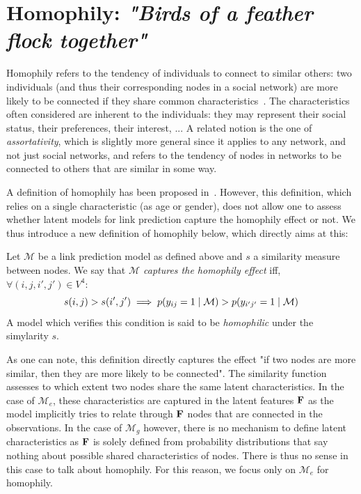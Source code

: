 \section{Homophily: \emph{"Birds of a feather flock together"}}
\label{sec:homophily}

Homophily refers to the tendency of individuals to connect to similar others: two individuals (and thus their corresponding nodes in a social network) are more likely to be connected if they share common characteristics~\cite{mcpherson2001birds,lazarsfeld1954friendship}. The characteristics often considered are inherent to the individuals: they may represent their social status, their preferences, their interest, ... A related notion is the one of {\it assortativity}, which is slightly more general since it applies to any network, and not just social networks, and refers to the tendency of nodes in networks to be connected to others that are similar in some way.

A definition of homophily has been proposed in~\cite{la2010randomization}. However, this definition, which relies on a single characteristic (as age or gender), does not allow one to assess whether latent models for link prediction capture the homophily effect or not. We thus introduce a new definition of homophily below, which directly aims at this:
%
\begin{definition}[Homophily]
	Let $\mathcal{M}$ be a link prediction model as defined above and $s$ a similarity measure between nodes. We say that \emph{$\mathcal{M}$ captures the homophily effect} iff, $\forall (i,j,i',j') \in V^4$:
%
\begin{equation}
s(i,j) > s(i',j')  \implies p(y_{ij}=1 \mid \mathcal{M}) > p(y_{i'j'}=1  \mid \mathcal{M}) \nonumber
\end{equation}
%
A model which verifies this condition is said to be \emph{homophilic} under the simylarity $s$.
\end{definition}
%
As one can note, this definition directly captures the effect "if two nodes are more similar, then they are more likely to be connected". The similarity function assesses to which extent two nodes share the same latent characteristics. In the case of $\mathcal{M}_e$, these characteristics are captured in the latent features $\mathbf{F}$ as the model implicitly tries to relate through $\mathbf{F}$ nodes that are connected in the observations. In the case of $\mathcal{M}_g$ however, there is no mechanism to define latent characteristics as $\mathbf{F}$ is solely defined from probability distributions that say nothing about possible shared characteristics of nodes. There is thus no sense in this case to talk about homophily. For this reason, we focus only on $\mathcal{M}_e$ for homophily. 

